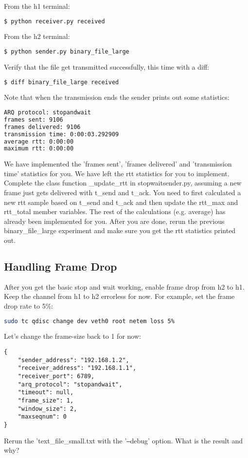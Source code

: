 \documentclass[11pt]{article}
\begin{document}
From the h1 terminal:
\begin{lstlisting}[language=bash]
$ python receiver.py received
\end{lstlisting}
From the h2 terminal:
\begin{lstlisting}[language=bash]
$ python sender.py binary_file_large
\end{lstlisting}


Verify that the file get transmitted successfully, this time with a diff:
\begin{lstlisting}[language=bash]
$ diff binary_file_large received
\end{lstlisting}

Note that when the transmission ends the sender prints out some statistics:

\begin{lstlisting}[language=bash]
ARQ protocol: stopandwait
frames sent: 9106
frames delivered: 9106
transmission time: 0:00:03.292909
average rtt: 0:00:00
maximum rtt: 0:00:00
\end{lstlisting}

We have implemented the 'frames sent', 'frames delivered' and 'transmission time' statistics for you. We have left the rtt statistics for you to implement. Complete the class function \_update\_rtt in stopwaitsender.py, assuming a new frame just gets delivered with t\_send and t\_ack. You need to first calculated a new rtt sample based on t\_send and t\_ack and then update the rtt\_max and rtt\_total member variables. The rest of the calculations (e.g. average) has already been implemented for you. After you are done, rerun the previous binary\_file\_large experiment and make sure you get the rtt statistics printed out.

\subsection{Handling Frame Drop}
After you get the basic stop and wait working, enable frame drop from h2 to h1. Keep the channel from h1 to h2 errorless for now. For example, set the frame drop rate to 5\%:
\begin{lstlisting}[language=bash]
sudo tc qdisc change dev veth0 root netem loss 5%
\end{lstlisting}
Let's change the frame-size back to 1 for now:

\begin{minipage}{\linewidth}
\begin{lstlisting}[caption={Configuration For Large File}]
{
    "sender_address": "192.168.1.2",
    "receiver_address": "192.168.1.1",
    "receiver_port": 6789,
    "arq_protocol": "stopandwait",
    "timeout": null,
    "frame_size": 1,
    "window_size": 2,
    "maxseqnum": 0
}
\end{lstlisting}
\end{minipage}
Rerun the 'text\_file\_small.txt with the '\texttt{--}debug' option. What is the result and why?
\end{document}
